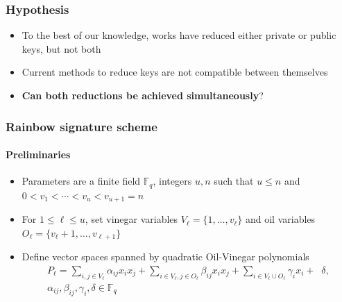 \documentclass[12pt]{beamer}
\begin{document}
\begin{frame}
  \frametitle{Hypothesis}
  \begin{itemize}
    \item To the best of our knowledge, works have reduced either private or
        public keys, but not both
    \item Current methods to reduce keys are not compatible between themselves
  \end{itemize}
  \vspace{1cm}
  \begin{itemize}
    \item \textbf{Can both reductions be achieved simultaneously}?
  \end{itemize}
\end{frame}

\begin{frame}
  \frametitle{Rainbow signature scheme}
  \framesubtitle{Preliminaries}
  \begin{itemize}
    \item Parameters are a finite field $\mathbb{F}_{q}$, integers $u, n$ such
        that $u \leq n$ and $0 < v_{1} < \cdots < v_{u} < v_{u + 1} = n$
    \item For $1 \leq \ell \leq u$, set vinegar variables
        $V_{\ell} = \{1, \dots, v_{\ell}\}$ and oil variables
          $O_{\ell} = \{v_{\ell} + 1, \dots, v_{\ell + 1}\}$
    \item Define vector spaces spanned by quadratic Oil-Vinegar polynomials
    \begin{align*}
      P_{\ell} = \sum_{i, j \in V_{\ell}} \alpha_{ij}  x_{i}  x_{j}
        + \sum_{i \in V_{\ell}, j \in O_{\ell}} \beta_{ij}  x_{i}  x_{j}
        + \sum_{i \in V_{\ell} \cup O_{\ell}} \gamma_{i}  x_{i} + \;\; \delta,
        \\ \alpha_{ij}, \beta_{ij}, \gamma_{i}, \delta \in \mathbb{F}_{q}
    \end{align*}
  \end{itemize}
\end{frame}
\end{document}
